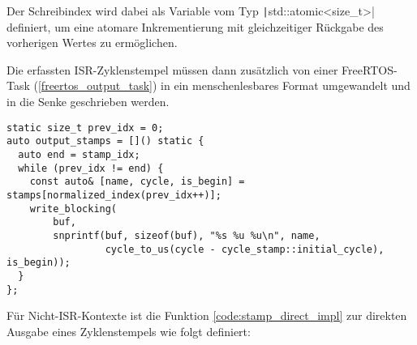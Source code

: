 Der Schreibindex wird dabei als Variable vom Typ
\texttt|std::atomic<size_t>| definiert, um eine atomare Inkrementierung
mit gleichzeitiger Rückgabe des vorherigen Wertes zu ermöglichen.

%

Die erfassten ISR-Zyklenstempel müssen dann zusätzlich von einer FreeRTOS-Task
(\ref{freertos_output_task}) in ein menschenlesbares Format umgewandelt und in
die Senke geschrieben werden.

\begin{code}
    \begin{verbatim}
static size_t prev_idx = 0;
auto output_stamps = []() static {
  auto end = stamp_idx;
  while (prev_idx != end) {
    const auto& [name, cycle, is_begin] = stamps[normalized_index(prev_idx++)];
    write_blocking(
        buf,
        snprintf(buf, sizeof(buf), "%s %u %u\n", name,
                 cycle_to_us(cycle - cycle_stamp::initial_cycle), is_begin));
  }
};
    \end{verbatim}
    \label{freertos_output_task}
\end{code}

Für Nicht-ISR-Kontexte ist die Funktion \ref{code:stamp_direct_impl} zur
direkten Ausgabe eines Zyklenstempels wie folgt definiert:

